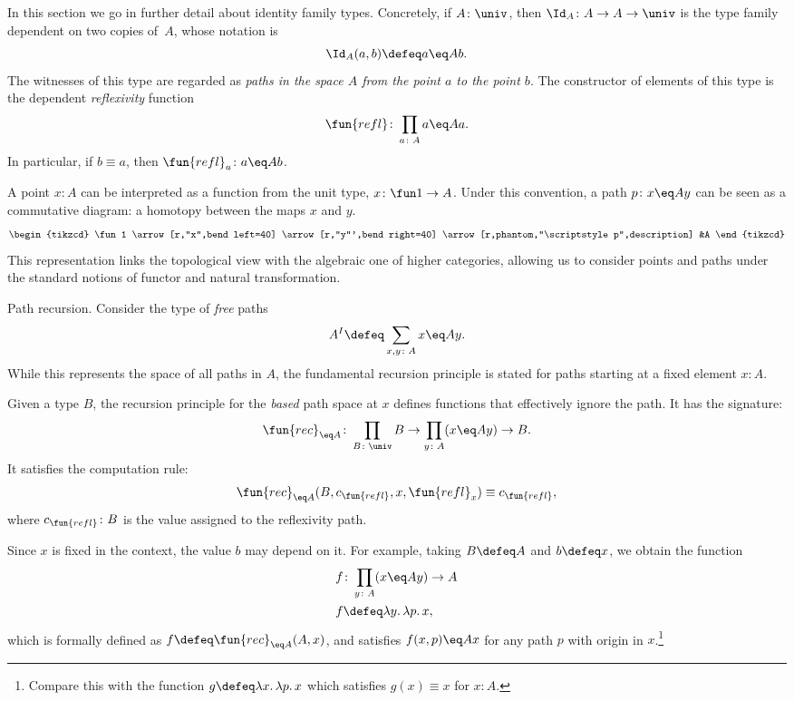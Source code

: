 In this section we go in further detail about identity family types. Concretely, if $A\colon\univ$, then $\Id_A\colon A\to A\to\univ$ is the type family dependent on two copies of~$A$, whose notation is 
\[
    \Id_A(a,b)\defeq a\eq Ab.
\]
The witnesses of this type are regarded as \textit{paths in the space $A$ from the point $a$ to the point $b$}. The constructor of elements of this type is the dependent \textsl{reflexivity} function
\[
    \fun{refl}\colon\prod_{a\colon A}a\eq Aa.
\]
In particular, if $b\equiv a$, then $\fun{refl}_a\colon a\eq Ab$.

\begin{rem}\label{rem:paths-as-2-cells}
    A point\/ $x\colon A$ can be interpreted as a function from the unit type, \/ $x\colon\fun1\to A$. Under this convention, a path\/ $p\colon x\eq Ay$ can be seen as a commutative diagram: a homotopy between the maps\/ $x$ and\/ $y$.
    \[
        \begin{tikzcd}
            \fun1
                    \arrow[r,"x",bend left=40]
                    \arrow[r,"y"',bend right=40]
                    \arrow[r,phantom,"\scriptstyle p",description]
                &A
        \end{tikzcd}
    \]
    This representation links the topological view with the algebraic one of higher categories, allowing us to consider points and paths under the standard notions of functor and natural transformation.
\end{rem}

\begin{lpar}{Path recursion.}
    Consider the type of \textsl{free} paths
    \[
        A^I \defeq \sum_{x,y\colon A} x\eq A y.
    \]
    While this represents the space of all paths in $A$, the fundamental recursion principle is stated for paths starting at a fixed element $x\colon A$.

    Given a type $B$, the recursion principle for the \textsl{based} path space at $x$ defines functions that effectively ignore the path. It has the signature:
    \[
        \fun{rec}_{\eq A}\colon\prod_{B\colon\univ}B
            \to\prod_{y\colon A}(x\eq Ay)\to B.
    \]
    It satisfies the computation rule:
    \[
        \fun{rec}_{\eq A}(B,c_{\fun{refl}},x,\fun{refl}_x)\equiv c_{\fun{refl}},
    \]
    where $c_{\fun{refl}}\colon B$ is the value assigned to the reflexivity path.

    Since $x$ is fixed in the context, the value $b$ may depend on it. For example, taking $B \defeq A$ and $b \defeq x$, we obtain the function
    \begin{align*}
        f &\colon \prod_{y\colon A} (x\eq A y) \to A \\
        f &\defeq \lambda y.\,\lambda p.\,x,
    \end{align*}
    which is formally defined as $f\defeq\fun{rec}_{\eq A}(A,x)$, and satisfies $f(x,p)\eq Ax$ for any path $p$ with origin in $x$.\footnote{Compare this with the function $g\defeq\lambda x.\,\lambda p.\,x$ which satisfies $g(x)\equiv x$ for $x\colon A$.}
\end{lpar}

